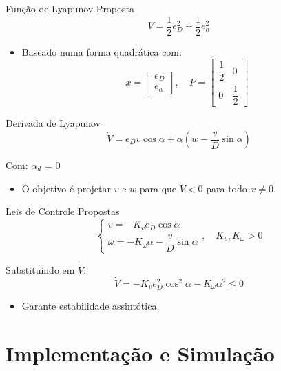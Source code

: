 \documentclass{beamer}
\begin{document}
\begin{frame}{Função de Lyapunov Proposta}
  \[
  V = \frac{1}{2} e_D^2 + \frac{1}{2} e_\alpha^2
  \]

    \begin{itemize}
        \item Baseado numa forma quadrática com:
        \[
        x = \begin{bmatrix} e_D \\ e_\alpha\end{bmatrix}, \quad
        P =
        \begin{bmatrix}
        \dfrac{1}{2} & 0 \\
        0 & \dfrac{1}{2}
        \end{bmatrix}
        \]
    \end{itemize}
\end{frame}

\begin{frame}{Derivada de Lyapunov}
  \[
  \dot{V} = e_D v\cos\alpha + \alpha\left(w - \dfrac{v}{D}\sin\alpha\right)
  \]

  Com: $\alpha_d$ = 0

  \begin{itemize}
    \item O objetivo é projetar $v$ e $w$ para que $\dot{V} < 0$ para todo $x \neq 0$.
  \end{itemize}
  
\end{frame}

\begin{frame}{Leis de Controle Propostas}
  \[
  \begin{cases}
  v = -K_v e_D \cos \alpha \\
  \omega = -K_\omega \alpha - \dfrac{v}{D} \sin \alpha
  \end{cases}, \quad K_v, K_\omega > 0
  \]

  Substituindo em $\dot{V}$:
  \[
  \dot{V} = -K_v e_D^2 \cos^2 \alpha - K_\omega \alpha^2 \leq 0
  \]

  \begin{itemize}
    \item Garante estabilidade assintótica.
  \end{itemize}
\end{frame}
\section{Implementação e Simulação}
\end{document}
